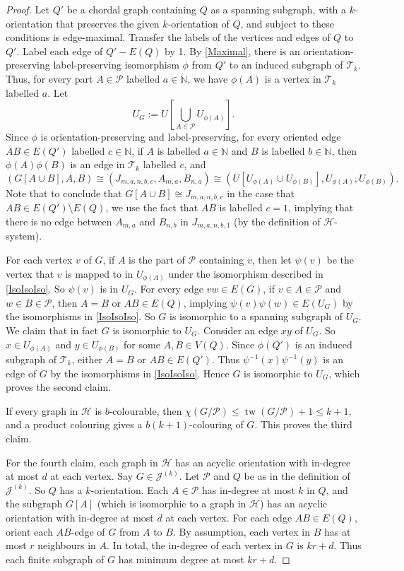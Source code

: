 \documentclass[a4paper,11pt]{article}
\theoremstyle{plain}
\theoremstyle{definition}
\renewcommand{\leq}{\leqslant}
\DeclareMathOperator{\tw}{tw}
\newcommand{\HH}{\mathcal{H}}
\newcommand{\JJ}{\mathcal{J}}
\newcommand{\TT}{\mathcal{T}}
\newcommand{\NN}{\mathbb{N}}
\newcommand{\PART}{\mathcal{P}}
\begin{document}
\begin{proof}
Let $Q'$ be a chordal graph containing $Q$ as a spanning subgraph, with a $k$-orientation that preserves the given $k$-orientation of $Q$, and subject to these conditions is edge-maximal. Transfer the labels of the vertices and edges of $Q$ to $Q'$. Label each edge of $Q'-E(Q)$ by 1. By 
\cref{Maximal}, there is an orientation-preserving label-preserving isomorphism $\phi$  from $Q'$ to an induced subgraph of $\TT_k$. Thus, for every part $A\in\PART$ labelled $a\in\NN$, we have $\phi(A)$ is a vertex in $\TT_k$ labelled $a$. Let 
$$U_G:=U\left[\bigcup_{A\in\PART} U_{\phi(A)}\right].$$ 
Since $\phi$ is orientation-preserving and label-preserving, for every oriented edge $AB\in E(Q')$ labelled $c\in\NN$, if $A$ is labelled $a\in\NN$ and $B$ is labelled $b\in\NN$, then $\phi(A)\phi(B)$ is an edge in $\TT_k$ labelled $c$, and  
\begin{equation}
\label{IsoIsoIso}
(G[A\cup B],A,B)\cong 
(J_{m,a,n,b,c},A_{m,a},B_{n,a}) \cong 
(U[ U_{\phi(A)} \cup U_{\phi(B)} ], U_{\phi(A)}, U_{\phi(B)} ). 
\end{equation}
Note that to conclude that $G[A\cup B]\cong J_{m,a,n,b,c}$ in the case that $AB\in E(Q')\setminus E(Q)$, we use the fact that $AB$ is labelled $c=1$, implying that there is no edge between $A_{m,a}$ and $B_{n,b}$ in $J_{m,a,n,b,1}$ (by the definition of $\HH$-system).

For each vertex $v$ of $G$, if $A$ is the part of $\PART$ containing $v$, then let $\psi(v)$ be the vertex that $v$ is mapped to in $U_{\phi(A)}$ under the isomorphism described in \cref{IsoIsoIso}. So $\psi(v)$ is in $U_G$. For every edge $vw\in E(G)$, if $v\in A\in\PART$ and $w\in B\in\PART$, then $A=B$ or $AB\in E(Q)$, implying $\psi(v)\psi(w)\in E(U_G)$ by the isomorphisms in \cref{IsoIsoIso}. So $G$ is isomorphic to a spanning subgraph of $U_G$. We claim that in fact $G$ is isomorphic to $U_G$. Consider an edge $xy$ of $U_G$. So $x\in U_{\phi(A)}$ and $y\in U_{\phi(B)}$ for some $A,B\in V(Q)$. 
Since $\phi(Q')$ is an induced subgraph of $\TT_k$, either $A=B$ or $AB\in E(Q')$. Thus $\psi^{-1}(x)\psi^{-1}(y)$ is an edge of $G$ by the isomorphisms in \cref{IsoIsoIso}. Hence $G$ is isomorphic to $U_G$, which proves the second claim. 

If every graph in $\HH$ is $b$-colourable, then $\chi(G/\PART)\leq\tw(G/\PART)+1\leq k+1$, and a product colouring gives a $b(k+1)$-colouring of $G$. This proves the third  claim. 

For the fourth claim, each graph in $\HH$ has an acyclic orientation with in-degree at most $d$ at each vertex. Say $G\in\JJ^{(k)}$. Let $\PART$ and $Q$ be as in the definition of $\JJ^{(k)}$. So $Q$ has a $k$-orientation. Each $A\in \PART$ has in-degree at most $k$ in $Q$, and the subgraph $G[A]$ (which is isomorphic to a graph in $\HH$) has an acyclic orientation with in-degree at most $d$ at each vertex. For each edge $AB\in E(Q)$, orient each $AB$-edge of $G$ from $A$ to $B$. By assumption, each vertex in $B$ has at most $r$ neighbours in $A$. In total, the in-degree of each vertex in $G$ is $kr+d$. Thus each finite subgraph of $G$ has minimum degree at most $kr+d$. 
\end{proof}
\end{document}
